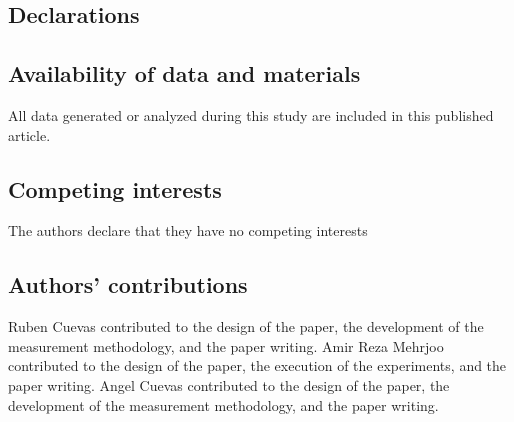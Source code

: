 \documentclass[twocolumn]{bmcart}\usepackage{lineno}
\begin{document}
 




















\begin{backmatter}



















       








\section*{Declarations}

\subsection*{Availability of data and materials}
All data generated or analyzed during this study are included in this published article.




\subsection*{Competing interests}
The authors declare that they have no competing interests 
\subsection*{Authors' contributions}

Ruben Cuevas contributed to the design of the paper, the development of the measurement methodology, and the paper writing.
Amir Reza Mehrjoo contributed to the design of the paper, the execution of the experiments, and the paper writing.
Angel Cuevas contributed to the design of the paper, the development of the measurement methodology, and the paper writing.


\end{backmatter}
\end{document}
